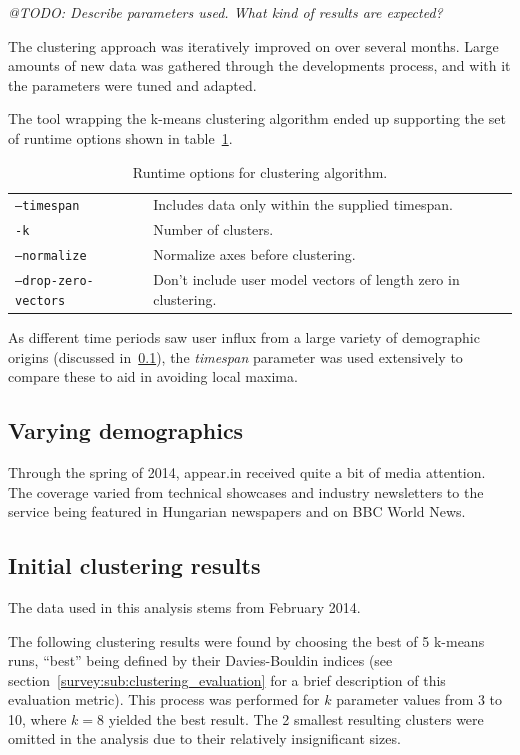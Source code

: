 \emph{@TODO: Describe parameters used. What kind of results are expected?}

The clustering approach was iteratively improved on over several months. Large amounts of new data was gathered through the developments process, and with it the parameters were tuned and adapted.

The tool wrapping the k-means clustering algorithm ended up supporting the set of runtime options shown in table~\ref{tab:clustering_runtime_options}.

\begin{table}[h]
  \begin{tabular}{ll}
    \texttt{--timespan}          & Includes data only within the supplied timespan. \\
    \texttt{-k}                 & Number of clusters. \\
    \texttt{--normalize}         & Normalize axes before clustering. \\
    \texttt{--drop-zero-vectors} & Don't include user model vectors of length zero in clustering. \\
  \end{tabular}
  \caption{Runtime options for clustering algorithm.}
  \label{tab:clustering_runtime_options}
\end{table}

As different time periods saw user influx from a large variety of demographic origins (discussed in~\ref{eval:sub:varying_demographics}), the \emph{timespan} parameter was used extensively to compare these to aid in avoiding local maxima.

\subsection{Varying demographics}
\label{eval:sub:varying_demographics}

Through the spring of 2014, appear.in received quite a bit of media attention. The coverage varied from technical showcases and industry newsletters to the service being featured in Hungarian newspapers and on BBC World News.

\subsection{Initial clustering results}
\label{eval:sec:clustering_results}

The data used in this analysis stems from February 2014.

The following clustering results were found by choosing the best of 5 k-means runs, ``best'' being defined by their Davies-Bouldin indices (see section~\ref{survey:sub:clustering_evaluation} for a brief description of this evaluation metric). This process was performed for $k$ parameter values from 3 to 10, where $k = 8$ yielded the best result. The 2 smallest resulting clusters were omitted in the analysis due to their relatively insignificant sizes.

